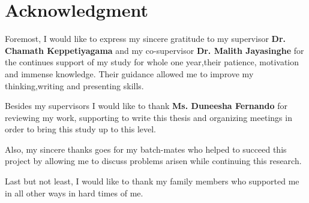 \chapter*{Acknowledgment}



Foremost, I would like to express my sincere gratitude to my supervisor  \textbf{Dr. Chamath Keppetiyagama} and my co-supervisor \textbf{Dr. Malith Jayasinghe} for the continues support of my study for whole one year,their patience, motivation and immense knowledge. Their guidance allowed me to improve my thinking,writing and presenting skills. 

Besides my supervisors I would like to thank \textbf{Ms. Duneesha Fernando} for reviewing my work, supporting to write this thesis and organizing meetings in order to bring this study up to this level.

Also, my sincere thanks goes for my batch-mates who helped to succeed this project by allowing me to discuss problems arisen while continuing this research.

Last but not least, I would like to thank my family members who supported me in all other ways in hard times of me. 